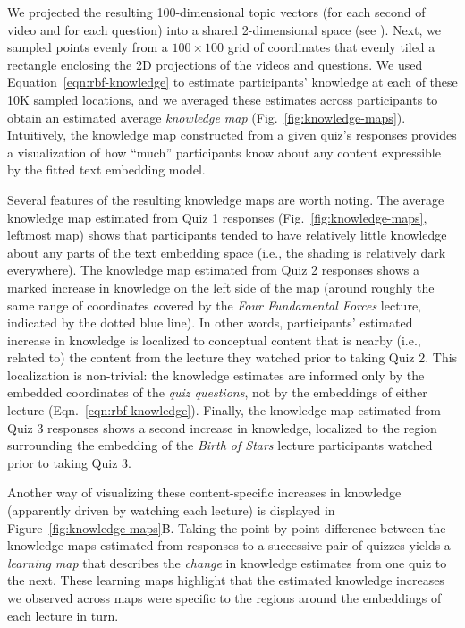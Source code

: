 \documentclass[10pt]{article}
\begin{document}
We projected the resulting 100-dimensional topic vectors (for each second of
video and for each question) into a shared 2-dimensional space (see
\textit{}). Next, we sampled
points evenly from a $100 \times 100$ grid of coordinates that evenly tiled a
rectangle enclosing the 2D projections of the videos and questions. We used
Equation~\ref{eqn:rbf-knowledge} to estimate participants' knowledge at each of
these 10K sampled locations, and we averaged these estimates across
participants to obtain an estimated average \textit{knowledge map}
(Fig.~\ref{fig:knowledge-maps}). Intuitively, the knowledge map constructed
from a given quiz's responses provides a visualization of how ``much''
participants know about any content expressible by the fitted text embedding
model.

Several features of the resulting knowledge maps are worth noting. The average
knowledge map estimated from Quiz 1 responses (Fig.~\ref{fig:knowledge-maps},
leftmost map) shows that participants tended to have relatively little
knowledge about any parts of the text embedding space (i.e., the shading is
relatively dark everywhere). The knowledge map estimated from Quiz 2 responses
shows a marked increase in knowledge on the left side of the map (around
roughly the same range of coordinates covered by the \textit{Four Fundamental
Forces} lecture, indicated by the dotted blue line). In other words,
participants' estimated increase in knowledge is localized to conceptual
content that is nearby (i.e., related to) the content from the lecture they
watched prior to taking Quiz 2. This localization is non-trivial: the knowledge
estimates are informed only by the embedded coordinates of the \textit{quiz
questions}, not by the embeddings of either lecture
(Eqn.~\ref{eqn:rbf-knowledge}). Finally, the knowledge map estimated from Quiz
3 responses shows a second increase in knowledge, localized to the region
surrounding the embedding of the \textit{Birth of Stars} lecture participants
watched prior to taking Quiz 3.

Another way of visualizing these content-specific increases in knowledge
(apparently driven by watching each lecture) is displayed in
Figure~\ref{fig:knowledge-maps}B. Taking the point-by-point difference between
the knowledge maps estimated from responses to a successive pair of quizzes
yields a \textit{learning map} that describes the \textit{change} in knowledge
estimates from one quiz to the next. These learning maps highlight that the
estimated knowledge increases we observed across maps were specific to the
regions around the embeddings of each lecture in turn.
\end{document}
